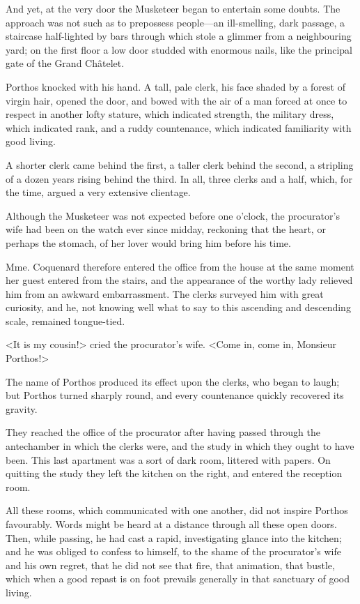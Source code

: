And yet, at the very door the Musketeer began to entertain some doubts. The approach was not such as to prepossess people---an ill-smelling, dark passage, a staircase half-lighted by bars through which stole a glimmer from a neighbouring yard; on the first floor a low door studded with enormous nails, like the principal gate of the Grand Châtelet. 

Porthos knocked with his hand. A tall, pale clerk, his face shaded by a forest of virgin hair, opened the door, and bowed with the air of a man forced at once to respect in another lofty stature, which indicated strength, the military dress, which indicated rank, and a ruddy countenance, which indicated familiarity with good living. 

A shorter clerk came behind the first, a taller clerk behind the second, a stripling of a dozen years rising behind the third. In all, three clerks and a half, which, for the time, argued a very extensive clientage. 

Although the Musketeer was not expected before one o'clock, the procurator's wife had been on the watch ever since midday, reckoning that the heart, or perhaps the stomach, of her lover would bring him before his time. 

Mme. Coquenard therefore entered the office from the house at the same moment her guest entered from the stairs, and the appearance of the worthy lady relieved him from an awkward embarrassment. The clerks surveyed him with great curiosity, and he, not knowing well what to say to this ascending and descending scale, remained tongue-tied. 

<It is my cousin!> cried the procurator's wife. <Come in, come in, Monsieur Porthos!> 

The name of Porthos produced its effect upon the clerks, who began to laugh; but Porthos turned sharply round, and every countenance quickly recovered its gravity. 

They reached the office of the procurator after having passed through the antechamber in which the clerks were, and the study in which they ought to have been. This last apartment was a sort of dark room, littered with papers. On quitting the study they left the kitchen on the right, and entered the reception room. 

All these rooms, which communicated with one another, did not inspire Porthos favourably. Words might be heard at a distance through all these open doors. Then, while passing, he had cast a rapid, investigating glance into the kitchen; and he was obliged to confess to himself, to the shame of the procurator's wife and his own regret, that he did not see that fire, that animation, that bustle, which when a good repast is on foot prevails generally in that sanctuary of good living. 

